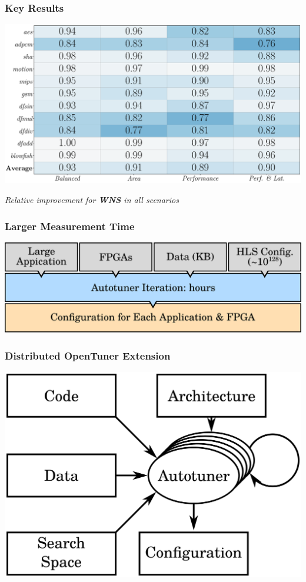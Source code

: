 \documentclass[10pt, compress, aspectratio=169]{beamer}
\begin{document}
\begin{frame}
    \frametitle{Key Results}
    \begin{center}
        \includegraphics[width=.9\textwidth]{heatmap_wns_comparison}

        \emph{Relative improvement for \textbf{WNS} in all scenarios}
    \end{center}
\end{frame}

\begin{frame}
    \frametitle{Larger Measurement Time}
    \begin{center}
        \includegraphics[width=.9\textwidth]{overview_fpgas_big}
    \end{center}
\end{frame}

\begin{frame}
    \frametitle{Distributed OpenTuner Extension}
    \begin{center}
        \includegraphics[width=.9\textwidth]{overview_distributed}
    \end{center}
\end{frame}
\end{document}
